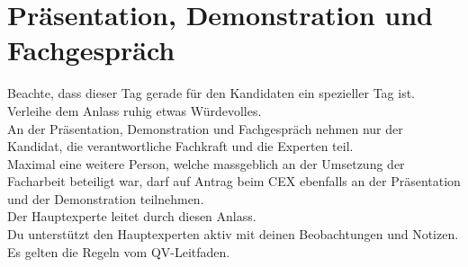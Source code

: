 \section{Präsentation, Demonstration und Fachgespräch}
Beachte, dass dieser Tag gerade für den Kandidaten ein spezieller Tag ist.\\
Verleihe dem Anlass ruhig etwas Würdevolles.\\
An der Präsentation, Demonstration und Fachgespräch nehmen nur der Kandidat, die verantwortliche Fachkraft und die Experten teil.\\
Maximal eine weitere Person, welche massgeblich an der Umsetzung der Facharbeit beteiligt war, darf auf Antrag beim CEX ebenfalls an der Präsentation und der Demonstration teilnehmen.\\
Der Hauptexperte leitet durch diesen Anlass.\\
Du unterstützt den Hauptexperten aktiv mit deinen Beobachtungen und Notizen.\\
Es gelten die Regeln vom QV-Leitfaden.

